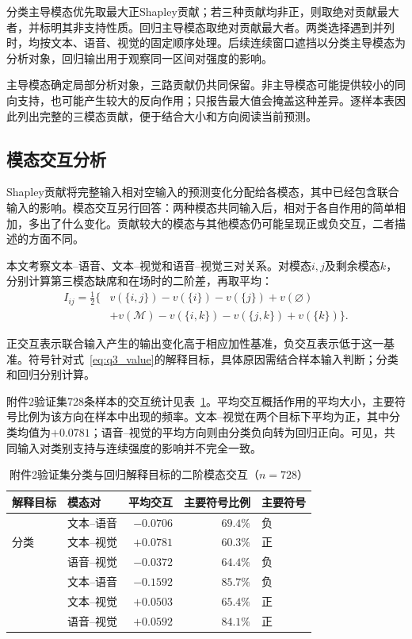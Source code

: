 \documentclass[UTF8,a4paper,12pt]{ctexart}
\newcommand{\QThreeParagraph}{\par\noindent\hspace*{2em}}
\begin{document}
\QThreeParagraph 分类主导模态优先取最大正Shapley贡献；若三种贡献均非正，则取绝对贡献最大者，并标明其非支持性质。回归主导模态取绝对贡献最大者。两类选择遇到并列时，均按文本、语音、视觉的固定顺序处理。后续连续窗口遮挡以分类主导模态为分析对象，回归输出用于观察同一区间对强度的影响。

\QThreeParagraph 主导模态确定局部分析对象，三路贡献仍共同保留。非主导模态可能提供较小的同向支持，也可能产生较大的反向作用；只报告最大值会掩盖这种差异。逐样本表因此列出完整的三模态贡献，便于结合大小和方向阅读当前预测。

\subsection{模态交互分析}\label{subsec:q3_interaction}
Shapley贡献将完整输入相对空输入的预测变化分配给各模态，其中已经包含联合输入的影响。模态交互另行回答：两种模态共同输入后，相对于各自作用的简单相加，多出了什么变化。贡献较大的模态与其他模态仍可能呈现正或负交互，二者描述的方面不同。

\QThreeParagraph 本文考察文本--语音、文本--视觉和语音--视觉三对关系。对模态$i,j$及剩余模态$k$，分别计算第三模态缺席和在场时的二阶差，再取平均：
\begin{equation}
\begin{aligned}
I_{ij}=\tfrac12\{&
v(\{i,j\})-v(\{i\})-v(\{j\})+v(\varnothing)\\
&+v(\mathcal M)-v(\{i,k\})-v(\{j,k\})+v(\{k\})\}.
\end{aligned}
\label{eq:q3_interaction}
\end{equation}
\QThreeParagraph 正交互表示联合输入产生的输出变化高于相应加性基准，负交互表示低于这一基准。符号针对式~\eqref{eq:q3_value}的解释目标，具体原因需结合样本输入判断；分类和回归分别计算。

\QThreeParagraph 附件2验证集728条样本的交互统计见表~\ref{tab:q3_interaction}。平均交互概括作用的平均大小，主要符号比例为该方向在样本中出现的频率。文本--视觉在两个目标下平均为正，其中分类均值为$+0.0781$；语音--视觉的平均方向则由分类负向转为回归正向。可见，共同输入对类别支持与连续强度的影响并不完全一致。

\begin{table}[H]
\centering\small
\caption{附件2验证集分类与回归解释目标的二阶模态交互（$n=728$）}
\label{tab:q3_interaction}
\begin{tabular}{@{}llrrl@{}}
\toprule
\QThreeParagraph 解释目标 & 模态对 & 平均交互 & 主要符号比例 & 主要符号\\
\midrule
\multirow{3}{*}{分类} & 文本--语音 & $-0.0706$ & $69.4\%$ & 负\\
 & 文本--视觉 & $+0.0781$ & $60.3\%$ & 正\\
 & 语音--视觉 & $-0.0372$ & $64.4\%$ & 负\\
\addlinespace
\multirow{3}{*}{回归} & 文本--语音 & $-0.1592$ & $85.7\%$ & 负\\
 & 文本--视觉 & $+0.0503$ & $65.4\%$ & 正\\
 & 语音--视觉 & $+0.0592$ & $84.1\%$ & 正\\
\bottomrule
\end{tabular}
\end{table}
\end{document}
